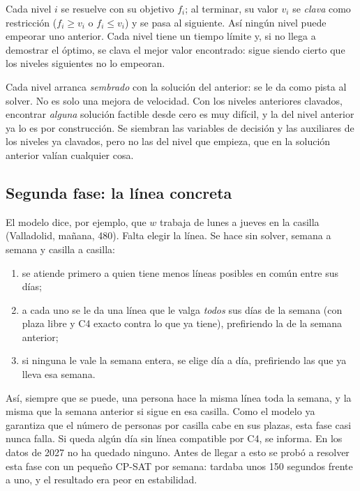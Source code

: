 \documentclass[11pt,a4paper]{article}
\begin{document}
Cada nivel $i$ se resuelve con su objetivo $f_i$; al terminar, su valor $v_i$ se \emph{clava} como
restricción ($f_i \ge v_i$ o $f_i \le v_i$) y se pasa al siguiente. Así ningún nivel puede
empeorar uno anterior. Cada nivel tiene un tiempo límite y, si no llega a demostrar el óptimo, se
clava el mejor valor encontrado: sigue siendo cierto que los niveles siguientes no lo empeoran.

Cada nivel arranca \emph{sembrado} con la solución del anterior: se le da como pista al solver.
No es solo una mejora de velocidad. Con los niveles anteriores clavados, encontrar \emph{alguna}
solución factible desde cero es muy difícil, y la del nivel anterior ya lo es por construcción.
Se siembran las variables de decisión y las auxiliares de los niveles ya clavados, pero no las
del nivel que empieza, que en la solución anterior valían cualquier cosa.

\subsection{Segunda fase: la línea concreta}

El modelo dice, por ejemplo, que $w$ trabaja de lunes a jueves en la casilla
(Valladolid, mañana, 480). Falta elegir la línea. Se hace sin solver, semana a semana y casilla a
casilla:
\begin{enumerate}[nosep]
  \item se atiende primero a quien tiene menos líneas posibles en común entre sus días;
  \item a cada uno se le da una línea que le valga \emph{todos} sus días de la semana (con plaza
        libre y C4 exacto contra lo que ya tiene), prefiriendo la de la semana anterior;
  \item si ninguna le vale la semana entera, se elige día a día, prefiriendo las que ya lleva esa
        semana.
\end{enumerate}
Así, siempre que se puede, una persona hace la misma línea toda la semana, y la misma que la
semana anterior si sigue en esa casilla. Como el modelo ya garantiza que el número de personas
por casilla cabe en sus plazas, esta fase casi nunca falla. Si queda algún día sin línea
compatible por C4, se informa. En los datos de 2027 no ha quedado ninguno. Antes de llegar a
esto se probó a resolver esta fase con un pequeño CP-SAT por semana: tardaba unos 150 segundos
frente a uno, y el resultado era peor en estabilidad.

\end{document}
